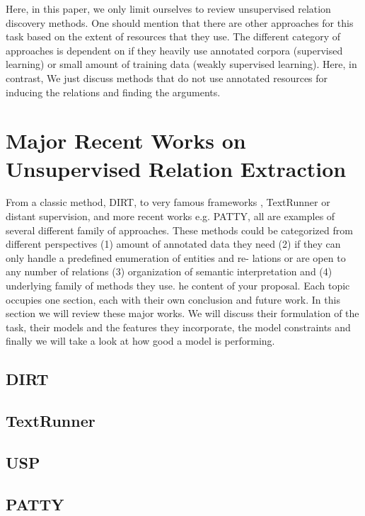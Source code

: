 \documentclass[12pt]{report}
\begin{document}
Here, in this paper, we only limit ourselves to review unsupervised relation discovery methods. 
One should mention that there are other approaches for this task based on the extent of resources that they use.
 The different category of approaches is dependent on if they heavily use annotated corpora (supervised learning) or 
 small amount of training data (weakly supervised learning). Here, in contrast, 
 We just discuss methods that do not use annotated resources for inducing the relations and finding the arguments. 



\chapter{Major Recent Works on Unsupervised Relation Extraction}
\label{ch:related}

From a classic method, DIRT, to very famous frameworks ,
TextRunner or distant supervision, and more recent works e.g. PATTY,
all are examples of several different family of approaches. These methods could
be categorized from different perspectives (1) amount of annotated data they
need (2) if they can only handle a predefined enumeration of entities and re-
lations or are open to any number of relations (3) organization of semantic
interpretation and (4) underlying family of methods they use.
he content of your proposal. Each topic occupies one section, each
with their own conclusion and future work.
In this section we will review these major works. We will discuss their formulation of the task, their models
 and the features they incorporate, the model constraints and finally we will take a look at how good a model is performing.


\section{DIRT}
\label{ch:unsupervised}

\section{TextRunner}
\label{ch:unsupervised}

\section{USP}
\label{ch:unsupervised}

\section{PATTY}
\label{ch:unsupervised}
\end{document}
